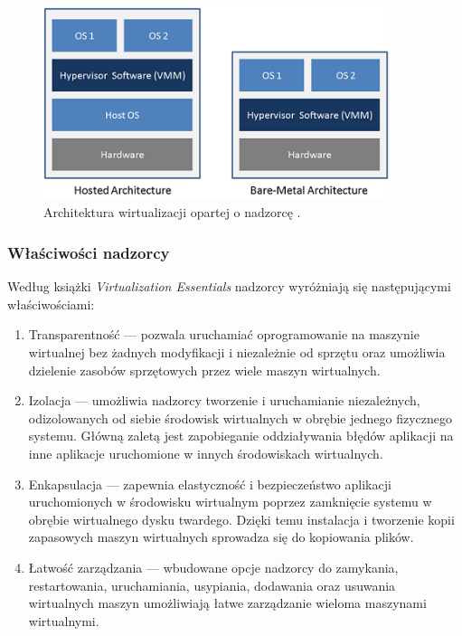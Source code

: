 \documentclass[12pt]{report}
\let\Oldsubsubsection\subsubsection
\renewcommand{\subsubsection}{\FloatBarrier\Oldsubsubsection}
\begin{document}
\begin{figure}[h]
	\centering
	\includegraphics[width=0.9\textwidth]{images/virtualizationArch.png}
	\caption{Architektura wirtualizacji opartej o nadzorcę \cite{hypervisorArchImg}.}
\end{figure}

\subsubsection{Właściwości nadzorcy}
Według książki \textit{Virtualization Essentials} \cite{virtualization} nadzorcy wyróżniają się następującymi właściwościami:
\begin{enumerate}
\item Transparentność --- pozwala uruchamiać oprogramowanie na maszynie wirtualnej bez żadnych modyfikacji i niezależnie od sprzętu oraz umożliwia dzielenie zasobów sprzętowych przez wiele maszyn wirtualnych.
\item Izolacja --- umożliwia nadzorcy tworzenie i uruchamianie niezależnych, odizolowanych od siebie środowisk wirtualnych w obrębie jednego fizycznego systemu. Główną zaletą jest zapobieganie oddziaływania błędów aplikacji na inne aplikacje uruchomione w innych środowiskach wirtualnych.
\item Enkapsulacja --- zapewnia elastyczność i bezpieczeństwo aplikacji uruchomionych w środowisku wirtualnym poprzez zamknięcie systemu w obrębie wirtualnego dysku twardego. Dzięki temu instalacja i tworzenie kopii zapasowych maszyn wirtualnych sprowadza się do kopiowania plików.
\item Łatwość zarządzania --- wbudowane opcje nadzorcy do zamykania, restartowania, uruchamiania, usypiania, dodawania oraz usuwania wirtualnych maszyn umożliwiają łatwe zarządzanie wieloma maszynami wirtualnymi.
\end{enumerate}
\end{document}
